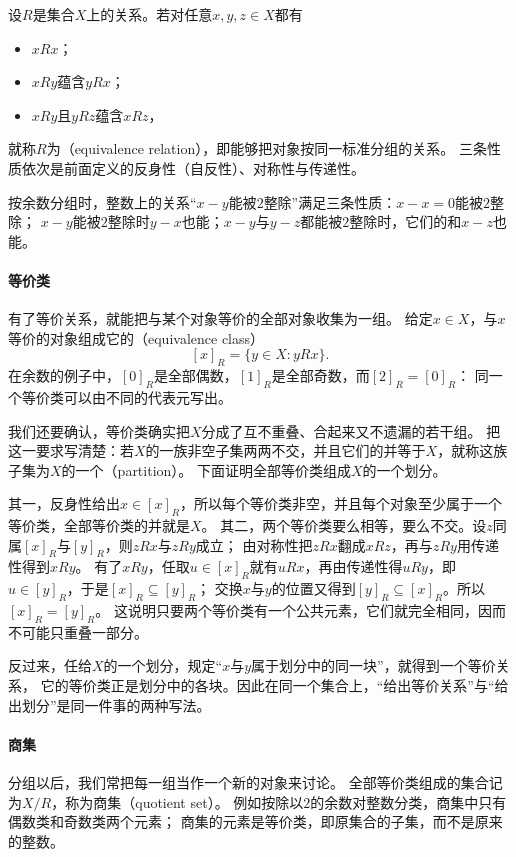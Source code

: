 \begin{definition}[等价关系]
\label{def:prelim-equivalence-relation}
设$R$是集合$X$上的关系。若对任意$x,y,z\in X$都有
\begin{itemize}
  \item $xRx$；
  \item $xRy$蕴含$yRx$；
  \item $xRy$且$yRz$蕴含$xRz$，
\end{itemize}
就称$R$为（equivalence relation），即能够把对象按同一标准分组的关系。
三条性质依次是前面定义的反身性（自反性）、对称性与传递性。
\end{definition}
按余数分组时，整数上的关系“$x-y$能被$2$整除”满足三条性质：$x-x=0$能被$2$整除；
$x-y$能被$2$整除时$y-x$也能；$x-y$与$y-z$都能被$2$整除时，它们的和$x-z$也能。

\paragraph{等价类}
有了等价关系，就能把与某个对象等价的全部对象收集为一组。
给定$x\in X$，与$x$等价的对象组成它的（equivalence class）
\[
 [x]_R=\{y\in X:yRx\}.
\]
在余数的例子中，$[0]_R$是全部偶数，$[1]_R$是全部奇数，而$[2]_R=[0]_R$：
同一个等价类可以由不同的代表元写出。

我们还要确认，等价类确实把$X$分成了互不重叠、合起来又不遗漏的若干组。
把这一要求写清楚：若$X$的一族非空子集两两不交，并且它们的并等于$X$，就称这族子集为$X$的一个（partition）。
下面证明全部等价类组成$X$的一个划分。

其一，反身性给出$x\in[x]_R$，所以每个等价类非空，并且每个对象至少属于一个等价类，全部等价类的并就是$X$。
其二，两个等价类要么相等，要么不交。设$z$同属$[x]_R$与$[y]_R$，则$zRx$与$zRy$成立；
由对称性把$zRx$翻成$xRz$，再与$zRy$用传递性得到$xRy$。
有了$xRy$，任取$u\in[x]_R$就有$uRx$，再由传递性得$uRy$，即$u\in[y]_R$，于是$[x]_R\subseteq[y]_R$；
交换$x$与$y$的位置又得到$[y]_R\subseteq[x]_R$。所以$[x]_R=[y]_R$。
这说明只要两个等价类有一个公共元素，它们就完全相同，因而不可能只重叠一部分。

反过来，任给$X$的一个划分，规定“$x$与$y$属于划分中的同一块”，就得到一个等价关系，
它的等价类正是划分中的各块。因此在同一个集合上，“给出等价关系”与“给出划分”是同一件事的两种写法。

\paragraph{商集}
分组以后，我们常把每一组当作一个新的对象来讨论。
全部等价类组成的集合记为$X/R$，称为商集（quotient set）。
例如按除以$2$的余数对整数分类，商集中只有偶数类和奇数类两个元素；
商集的元素是等价类，即原集合的子集，而不是原来的整数。

